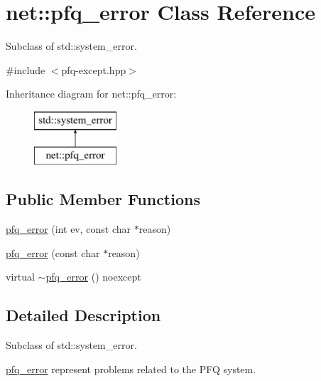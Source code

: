 \hypertarget{classnet_1_1pfq__error}{\section{net\-:\-:pfq\-\_\-error Class Reference}
\label{classnet_1_1pfq__error}
}


Subclass of std\-::system\-\_\-error.  




{\ttfamily \#include $<$pfq-\/except.\-hpp$>$}

Inheritance diagram for net\-:\-:pfq\-\_\-error\-:\begin{figure}[H]
\begin{center}
\leavevmode
\includegraphics[height=2.000000cm]{classnet_1_1pfq__error}
\end{center}
\end{figure}
\subsection*{Public Member Functions}
\begin{DoxyCompactItemize}
\item 
\hyperlink{classnet_1_1pfq__error_af2d9de405f6302a2b086d124cebefd82}{pfq\-\_\-error} (int ev, const char $\ast$reason)
\item 
\hyperlink{classnet_1_1pfq__error_aad416b1835ae059b8907a1c94e695a2c}{pfq\-\_\-error} (const char $\ast$reason)
\item 
virtual \hyperlink{classnet_1_1pfq__error_abc9c3391a06f55507153b6acbb896eef}{$\sim$pfq\-\_\-error} () noexcept
\end{DoxyCompactItemize}


\subsection{Detailed Description}
Subclass of std\-::system\-\_\-error. 

\hyperlink{classnet_1_1pfq__error}{pfq\-\_\-error} represent problems related to the P\-F\-Q system. 

